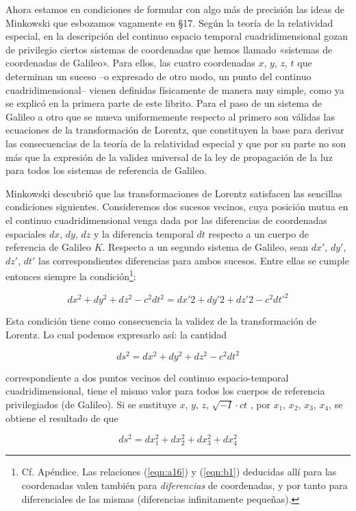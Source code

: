 \documentclass[spanish]{book}
\begin{document}
Ahora estamos en condiciones de formular con algo más de precisión las ideas
de Minkowski que esbozamos vagamente en \S 17. Según la teoría de la relatividad
especial, en la descripción del continuo espacio temporal cuadridimensional gozan
de privilegio ciertos sistemas de coordenadas que hemos llamado «sistemas de
coordenadas de Galileo». Para ellos, las cuatro coordenadas $x$, $y$, $z$, $t$ que determinan
un suceso --o expresado de otro modo, un punto del continuo cuadridimensional--
vienen definidas físicamente de manera muy simple, como ya se explicó en la
primera parte de este librito. Para el paso de un sistema de Galileo a otro que se
mueva uniformemente respecto al primero son válidas las ecuaciones de la transformación
de Lorentz, que constituyen la base para derivar las consecuencias de la teoría de
la relatividad especial y que por su parte no son más que la expresión de la validez
universal de la ley de propagación de la luz para todos los sistemas de referencia de
Galileo.

Minkowski descubrió que las transformaciones de Lorentz satisfacen las sencillas
condiciones siguientes. Consideremos dos sucesos vecinos, cuya posición mutua en el
continuo cuadridimensional venga dada por las diferencias de coordenadas espaciales
$dx$, $dy$, $dz$ y la diferencia temporal $dt$ respecto a un cuerpo de referencia de Galileo $K$.
Respecto a un segundo sistema de Galileo, sean $dx'$, $dy'$, $dz'$, $dt'$ las correspondientes
diferencias para ambos sucesos. Entre ellas se cumple entonces siempre la condición\footnote{Cf.
Apéndice. Las relaciones (\ref{eqn:a16}) y (\ref{eqn:b1}) deducidas allí para las coordenadas valen también para
\textit{diferencias} de coordenadas, y por tanto para diferenciales de las mismas (diferencias
infinitamente pequeñas).}:

\[dx^{2}+dy^{2}+dz^{2}-c^{2}dt^{2}=dx'2+dy'2+dz'2-c^{2}dt'^{2}\]

Esta condición tiene como consecuencia la validez de la transformación de
Lorentz. Lo cual podemos expresarlo así: la cantidad

\[ds^{2}=dx^{2}+dy^{2}+dz^{2}-c^{2}dt^{2}\]

\noindent correspondiente a dos puntos vecinos del continuo espacio-temporal
cuadridimensional, tiene el mismo valor para todos los cuerpos de referencia
privilegiados (de Galileo). Si se sustituye $x$, $y$, $z$, $\sqrt{-I}\cdot ct$ , por
$x_{1}$, $x_{2}$, $x_{3}$, $x_{4}$, se obtiene el resultado de que

\[ds^{2}=dx_{1}^{2}+dx_{2}^{2}+dx_{3}^{2}+dx_{4}^{2}\]
\end{document}
